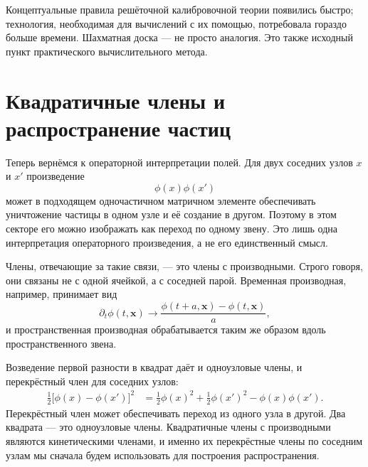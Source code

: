 Концептуальные правила решёточной калибровочной теории появились быстро; технология, необходимая для вычислений с их помощью, потребовала гораздо больше времени. Шахматная доска — не просто аналогия. Это также исходный пункт практического вычислительного метода.

\section{Квадратичные члены и распространение частиц}

Теперь вернёмся к операторной интерпретации полей. Для двух соседних узлов \(x\) и \(x'\) произведение
\begin{equation}
\phi(x)\phi(x')
\end{equation}
может в подходящем одночастичном матричном элементе обеспечивать уничтожение частицы в одном узле и её создание в другом. Поэтому в этом секторе его можно изображать как переход по одному звену. Это лишь одна интерпретация операторного произведения, а не его единственный смысл.

Члены, отвечающие за такие связи, — это члены с производными. Строго говоря, они связаны не с одной ячейкой, а с соседней парой. Временная производная, например, принимает вид
\begin{equation}
\partial_t\phi(t,\mathbf{x})
\longrightarrow
\frac{\phi(t+a,\mathbf{x})-\phi(t,\mathbf{x})}{a},
\end{equation}
и пространственная производная обрабатывается таким же образом вдоль пространственного звена.

\begin{classroomqa}
\end{classroomqa}

Возведение первой разности в квадрат даёт и одноузловые члены, и перекрёстный член для соседних узлов:
\begin{align}
\frac{1}{2}\bigl[\phi(x)-\phi(x')\bigr]^2
&=
\frac{1}{2}\phi(x)^2
+\frac{1}{2}\phi(x')^2
-\phi(x)\phi(x').
\end{align}
Перекрёстный член может обеспечивать переход из одного узла в другой. Два квадрата — это одноузловые члены. Квадратичные члены с производными являются кинетическими членами, и именно их перекрёстные члены по соседним узлам мы сначала будем использовать для построения распространения.

